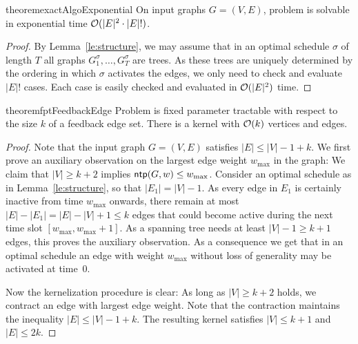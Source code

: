 \begin{restatable}{theorem}{exactAlgoExponential}
\label{th:exact}
On input graphs $G=(V,E)$, problem {\xxxNTP} is solvable in exponential time $\mathcal{O}(|E|^2\cdot|E|!)$. 
\end{restatable}
\begin{proof}
By Lemma~\ref{le:structure}, we may assume that in an optimal schedule $\sigma$ of length $T$ 
all graphs $G_1^\sigma, \dots, G_T^\sigma$ are trees.
As these trees are uniquely determined by the ordering in which $\sigma$ activates the edges,
we only need to check and evaluate $|E|!$ cases.
Each case is easily checked and evaluated in $\mathcal{O}(|E|^2)$ time.
 
\end{proof}

\begin{restatable}{theorem}{fptFeedbackEdge}
\label{thm:FPT_feedback_edge_set}
Problem {\xxxNTP} is fixed parameter tractable with respect to the size $k$ of a feedback edge set. 
There is a kernel with $\mathcal{O}(k)$ vertices and edges. 
\end{restatable}
\begin{proof}
Note that the input graph $G=(V,E)$ satisfies $|E|\le|V|-1+k$.
We first prove an auxiliary observation on the largest edge weight $w_{\max}$ in the graph:
We claim that $|V|\ge k+2$ implies $\operatorname{\textsf{ntp}}(G,w)\le w_{\max}$. 
Consider an optimal schedule as in Lemma~\ref{le:structure}, so that $|E_1|=|V|-1$.
As every edge in $E_1$ is certainly inactive from time $w_{\max}$ onwards, there remain at most 
$|E|-|E_1|=|E|-|V|+1\le k$ edges that could become active during the next time slot $[w_{\max},w_{\max}+1]$.
As a spanning tree needs at least $|V|-1\ge k+1$ edges, this proves the auxiliary observation.
As a consequence we get that in an optimal schedule an edge with weight $w_{\max}$ without loss 
of generality may be activated at time~$0$.

Now the kernelization procedure is clear:
As long as $|V|\ge k+2$ holds, we contract an edge with largest edge weight.
Note that the contraction maintains the inequality $|E|\le|V|-1+k$.
The resulting kernel satisfies $|V|\le k+1$ and $|E|\le2k$.
 
\end{proof}


